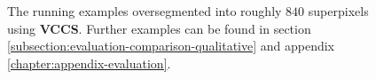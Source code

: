 \begin{figure}[t]
{	}
	\caption[The running examples oversegmented using \textbf{VCCS} \cite{PaponAbramovSchoelerWoergoetter:2013}.]{The running examples oversegmented into roughly $840$ superpixels using \textbf{VCCS}. Further examples can be found in section \ref{subsection:evaluation-comparison-qualitative} and appendix \ref{chapter:appendix-evaluation}.}
	\label{fig:superpixel-segmentation-depth-vccs-comparison}
\end{figure}